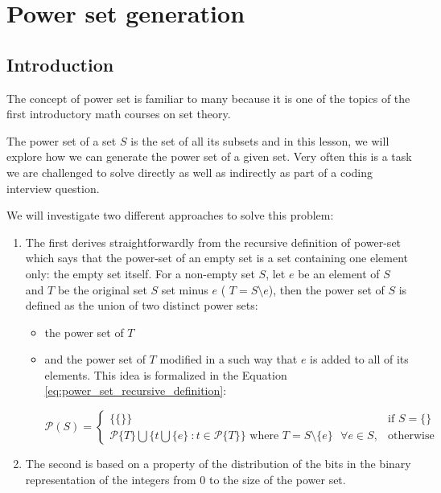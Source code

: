 %


\chapter{Power set generation}
\label{ch:power_set}
\section*{Introduction}

The concept of power set is familiar to many because it is one of the topics of the first
introductory math courses on set theory.

The power set of a set $S$ is the set of all its subsets and in this lesson, we will explore how we can generate the power set of a given set. Very often this is a task we are challenged to solve directly as well as indirectly as part of a coding interview question.

We will investigate two different approaches to solve this problem: 

\begin{enumerate}
    \item The first derives straightforwardly from the recursive definition of power-set which says that the power-set of an empty set is a set containing one element only: the empty set itself. 
    For a non-empty set $S$, let $e$ be an element of $S$ and $T$ be the original set $S$ set minus $e$ ( $T=S \setminus e$), then the power set of $S$ is defined as the union of two distinct power sets:
    \begin{itemize}
        \item   the power set of $T$
        \item   and the power set of $T$ modified in a such way that $e$ is added to all of its elements. 
    This idea is formalized in the Equation \ref{eq:power_set_recursive_definition}:

    $\mathcal{P}(S)=\begin{cases} 
        \{\{\}\} & \text{if } S=\{\} \\
        \mathcal{P}\{T\} \bigcup \{t \bigcup \{e\} \: : t \in \mathcal{P}\{T\}\} \text{ where }  T = S \setminus \{e\} \text{ } \forall e \in S, & \text{otherwise}
        \end{cases}$
    \end{itemize}
    
    \item The second is based on a property of the distribution of the bits in the binary representation of the integers from $0$ to the size of the
    power set. 

\end{enumerate}




